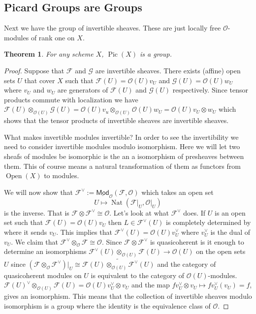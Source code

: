\documentclass[12pt]{article}
\numberwithin{equation}{section}
\newtheorem{theorem}{Theorem}[subsection]
\theoremstyle{definition}
\theoremstyle{remark}
\newcommand{\Ocal}{\mathcal{O}}
\newcommand{\Pic}{\operatorname{Pic}}
\newcommand{\Fcal}{\mathcal{F}}
\newcommand{\Open}{\operatorname{Open}}
\newcommand{\Nat}{\operatorname{Nat}}
\begin{document}
\subsection{Picard Groups are Groups}
Next we have the group of invertible sheaves. These are just locally free $\Ocal$-modules of rank one on $X$.
\begin{theorem}
	For any scheme $X$, $\Pic(X)$ is a group.
\end{theorem}
\begin{proof}
	Suppose that $\mathcal F$ and $\mathcal G$ are invertible sheaves. There exists (affine) open sets $U$ that cover $X$ such that $\mathcal F(U) = \mathcal O(U) v_U$ and $\mathcal G(U) = \mathcal O(U) w_U $ where $v_U$ and $w_U$ are generators of $\mathcal F(U)$ and $\mathcal G(U)$ respectively. 
	Since tensor products commute with localization we have $\mathcal F(U)\otimes_{\mathcal O(U)} \mathcal G(U) = \mathcal O(U) v_u  \otimes_{\mathcal O(U)} \mathcal O(U) w_U  = \mathcal O(U)  v_U \otimes w_U$ which shows that the tensor products of invertible sheaves are invertible sheaves.
	
	What makes invertible modules invertible? In order to see the invertibility we need to consider invertible modules modulo isomorphism.
	Here we will let two sheafs of modules be isomorphic is the an a isomorphism of presheaves between them. This of course means a natural transformation of them as functors from $\Open(X)$ to modules. 
	
	We will now show that $\mathcal F^{\vee}:= \underline{\mathsf{Mod}}_{\mathcal O}(\mathcal F,\mathcal O)$ which takes an open set 
	$$U \mapsto \Nat(\mathcal F\vert_U, \mathcal O\vert_U )$$
	is the inverse.  That is $\Fcal\otimes\Fcal^{\vee} \cong \Ocal$.
	Let's look at what $\Fcal^{\vee}$ does. 
	If $U$ is an open set such that $\Fcal(U) = \Ocal(U) v_U $ then $L\in \Fcal^{\vee}(U)$ is completely determined by where it sends $v_U$. 
	This implies that $\Fcal^{\vee}(U)=\mathcal O(U) v_U^{\vee}$ where $v_U^{\vee}$ is the dual of $v_U$. We claim that $\mathcal F^{\vee}\otimes_{\mathcal O} \mathcal F\cong \mathcal O$. 
	Since $\mathcal F\otimes \Fcal^{\vee}$ is quasicoherent is it enough to determine an isomorphisms $\mathcal F^{\vee}(U)\otimes_{\mathcal O(U)} \mathcal F(U) \to \mathcal O(U)$ on the open sets $U$ since $(\mathcal F\otimes_\mathcal O \mathcal F^{\vee})\vert_U \cong \widetilde{\mathcal F(U) \otimes_{\mathcal O(U)} \Fcal^{\vee}(U)}$ and the category of quasicoherent modules on $U$ is equivalent to the category of $\Ocal(U)$-modules. 
	$\mathcal F(U)^{\vee}\otimes_{\mathcal O(U)}\mathcal F(U) = \mathcal O(U) v_U^{\vee}\otimes v_U $ and the map $ f v_U^{\vee} \otimes v_U \mapsto f v_U^{\vee}(v_U) = f$, gives an isomorphism. 
	This means that the collection of invertible sheaves modulo isomorphism is a group where the identity is the equivalence class of $\mathcal O$.
\end{proof}
\end{document}
